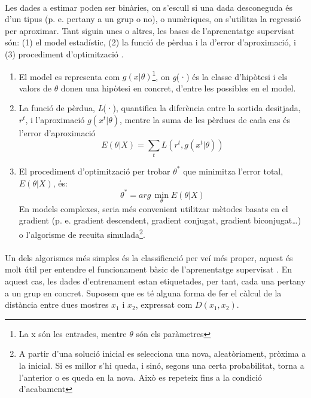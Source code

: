\documentclass[12pt,a4paper,final,twoside]{article}
\begin{document}
\paragraph{}Les dades a estimar poden ser binàries, on s'escull si una dada desconeguda és d'un tipus (p. e. pertany a un grup o no), o numèriques, on s'utilitza la regressió per aproximar. Tant siguin unes o altres, les bases de l'aprenentatge supervisat són: (1) el model estadístic, (2) la funció de pèrdua i la d'error d'aproximació, i (3) procediment d'optimització \cite{Alpaydin2004}.

\begin{enumerate}

\item El model es representa com $g(x|\theta)$\footnote{La x són les entrades, mentre $\theta$ són els paràmetres}, on \textit{g}(·) és la classe d'hipòtesi i els valors de $\theta$ donen una hipòtesi en concret, d'entre les possibles en el model.

\item La funció de pèrdua, \textit{L}(·), quantifica la diferència entre la sortida desitjada, $r^t$, i l'aproximació $g(x^t|\theta)$, mentre la suma de les pèrdues de cada cas és l'error d'aproximació \begin{equation} \label{eq:er-aprox}
E(\theta|X)=\sum_{t} L(r^t,g(x^t|\theta))
\end{equation}

\item El procediment d'optimització per trobar $\theta^*$ que minimitza l'error total, $E(\theta|X)$, és:
\begin{equation} \label{eq:theta-opt}
\theta^*=arg\,\operatorname*{min}_\theta E(\theta|X)
\end{equation}
En models complexes, seria més convenient utilitzar mètodes basats en el gradient (p. e. gradient descendent, gradient conjugat, gradient biconjugat\dots) o l'algorisme de recuita simulada\footnote{A partir d'una solució inicial es selecciona una nova, aleatòriament, pròxima a la inicial. Si es millor s'hi queda, i sinó, segons una certa probabilitat, torna a l'anterior o es queda en la nova. Això es repeteix fins a la condició d'acabament\cite{Torrent-Fontbona2013}}.

\end{enumerate}

\paragraph{}Un dels algorismes més simples és la classificació per veí més proper, aquest és molt útil per entendre el funcionament bàsic de l'aprenentatge supervisat \cite{Learned-Miller2014}. En aquest cas, les dades d'entrenament estan etiquetades, per tant, cada una pertany a un grup en concret. Suposem que es té alguna forma de fer el càlcul de la distància entre dues mostres $x_{1}$ i $x_{2}$, expressat com $D(x_{1}, x_{2})$.
\end{document}
